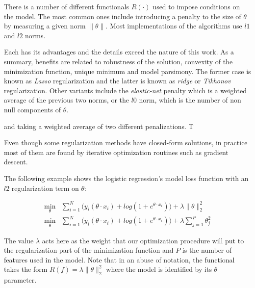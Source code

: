 There is a number of different functionals $R(\cdot)$ used to impose conditions on the model. The most common ones include introducing a penalty to the size of $\theta$ by measuring a given norm  $\| \theta \|$.  Most implementations of the algorithms use $l1$ and $l2$ norms.

Each has its advantages and the details exceed the nature of this work. As a summary, benefits are related to robustness of the solution, convexity of the minimization function, unique minimum and model parsimony. The former case is known as \textit{ Lasso} regularization and the latter is known as \textit{ridge} or \textit{Tikhonov} regularization. Other variants include the \textit{elastic-net} penalty which is a weighted average of the previous two norms, or the $l0$ norm, which is the number of non null components of $\theta$.


and taking a weighted average of two different penalizations. T

Even though some regularization methods have closed-form solutions, in practice most of them are found by iterative optimization routines such as gradient descent.

The following example shows the logistic regression's model loss function with an $l2$ regularization term on $\theta$:

\begin{equation} \label{logitRegularization}
\begin{split}
\min_{\theta} &  \sum_{i=1}^N \big(y_i ( \theta \cdot x_i ) + log(1 + e^{\theta \cdot x_i} ) \big)  +  \lambda \| \theta\|_{2}^2 \\
\min_{\theta} &  \sum_{i=1}^N \big(y_i ( \theta \cdot x_i ) + log(1 + e^{\theta \cdot x_i} ) \big) +  \lambda \sum_{j=1}^P  \theta_j^2
\end{split}
\end{equation}


%


The value $\lambda$ acts here as the weight that our optimization procedure will put to the regularization part of the minimization function and $P$  is the number of features used in the model. Note that in an abuse of notation, the functional takes the form  $R(f) = \lambda\| \theta\|_{2}^2$ where the model is identified by its $\theta$ parameter.

